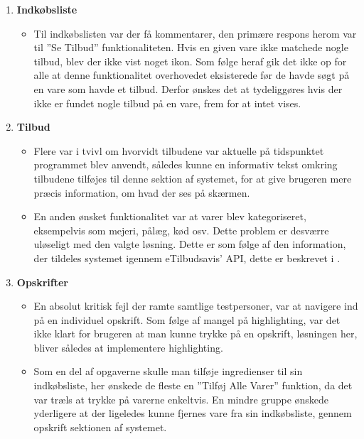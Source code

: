 \begin{enumerate}
   \item \textbf{Indkøbsliste} \begin{itemize}
   								  \item Til indkøbslisten var der få kommentarer, den primære respons herom var til ''Se Tilbud'' funktionaliteten. Hvis en given vare ikke matchede nogle tilbud, blev der ikke vist noget ikon. Som følge heraf gik det ikke op for alle at denne funktionalitet overhovedet eksisterede før de havde søgt på en vare som havde et tilbud. Derfor ønskes det at tydeliggøres hvis der ikke er fundet nogle tilbud på en vare, frem for at intet vises.
   							   \end{itemize}
   \item \textbf{Tilbud}\begin{itemize}
   								  \item Flere var i tvivl om hvorvidt tilbudene var aktuelle på tidspunktet programmet blev anvendt, således kunne en informativ tekst omkring tilbudene tilføjes til denne sektion af systemet, for at give brugeren mere præcis information, om hvad der ses på skærmen.
   								  
   								  \item En anden ønsket funktionalitet var at varer blev kategoriseret, eksempelvis som mejeri, pålæg, kød osv. Dette problem er desværre uløseligt med den valgte løsning.
   								  Dette er som følge af den information, der tildeles systemet igennem eTilbudsavis' API, dette er beskrevet i .
   							   \end{itemize}
   \item \textbf{Opskrifter}\begin{itemize}
   								  \item En absolut kritisk fejl der ramte samtlige testpersoner, var at navigere ind på en individuel opskrift. Som følge af mangel på highlighting, var det ikke klart for brugeren at man kunne trykke på en opskrift, løsningen her, bliver således at implementere highlighting.
   								  
   								  \item Som en del af opgaverne skulle man tilføje ingredienser til sin indkøbsliste, her ønskede de fleste en ''Tilføj Alle Varer'' funktion, da det var træls at trykke på varerne enkeltvis.
   								  En mindre gruppe ønskede yderligere at der ligeledes kunne fjernes vare fra sin indkøbsliste, gennem opskrift sektionen af systemet.
   								  

\end{itemize}
\end{enumerate}
